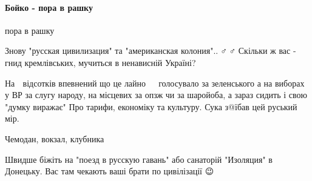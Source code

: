  
 
 
 
 
\paragraph{Бойко - пора в рашку}

\begin{itemize}
 
пора в рашку

 
Знову "русская цивилизация" та "американская колония"..🤦♂️🤦♂️ Скільки ж вас -
гнид кремлівських, мучиться в ненависній Україні?


 

На 💯 відсотків впевнений що це лайно 💩💩💩 голосувало за зеленського а на
виборах у ВР за слугу народу, на місцевих за опзж чи за шаройоба, а зараз
сидить і свою "думку виражає" Про тарифи, економіку та культуру. Сука з@їбав
цей руський мір.

\begin{itemize}
 
Чемодан, вокзал, клубника
\end{itemize}

 
Швидше біжіть на "поезд в русскую гавань" або санаторій "Изоляция" в Донецьку.
Вас там чекають ваші брати по цивілізації 😉



\end{itemize}
